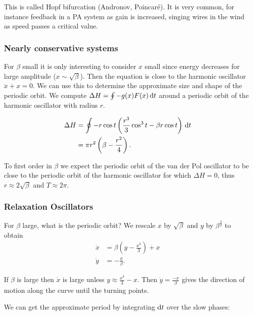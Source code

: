\documentclass{notes}
\theoremstyle{plain}
\begin{document}
\vspace{2.5in}

This is called Hopf bifurcation (Andronov, Poincar\'e).  It is very common,
for instance feedback in a PA system as gain is increased, singing wires in
the wind as speed passes a critical value.

\subsubsection*{Nearly conservative systems}

For $\beta$ small it is only interesting to consider $x$ small since energy
decreases for large amplitude ($x \sim \sqrt{\beta}$).  Then the equation
is close to the harmonic oscillator $\ddot{x} + x = 0$.  We can use
this to determine the approximate size and shape of the periodic orbit.  We
compute $\Delta H = \oint -g(x) F(x)\,\mathrm{d} t$ around a periodic orbit of the
harmonic oscillator with radius $r$.

\begin{align*}
\Delta H &= \oint -r \cos t \left(\frac{r^3}{3} \cos^3 t - \beta r \cos t
\right)\,\mathrm{d} t \\
&= \pi r^2 \left( \beta - \frac{r^2}{4} \right). 
\end{align*}

To first order in $\beta$ we expect the periodic orbit of the van der Pol
oscillator to be close to the periodic orbit of the harmonic oscillator
for which $\Delta H = 0$, thus $r \approx 2 \sqrt{\beta}$ and
$T \approx 2 \pi$.

\subsubsection*{Relaxation Oscillators}

For $\beta$ large, what is the periodic orbit?  We rescale $x$ by
$\sqrt{\beta}$ and $y$ by $\beta^{\frac{3}{2}}$ to obtain
\begin{align*}
\dot{x} &= \beta \left( y - \frac{x^3}{3} \right)  + x \\
\dot{y} &= - \frac{x}{\beta}.
\end{align*}

If $\beta$ is large then $\dot{x}$ is large unless
$y \approx \frac{x^3}{3} -x$. Then $\dot{y} = \frac{-x}{\beta}$ gives the
direction of motion along the curve until the turning points.

\vspace{2.5in}

We can get the approximate period by integrating $\mathrm{d} t$ over the slow phases:
\end{document}
